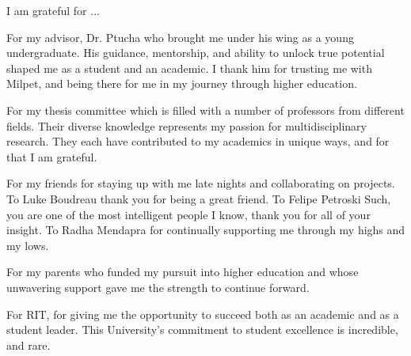 \documentclass[12pt,american]{report}
\begin{document}
%
\vfill
\begin{center}
\indent I am grateful for ...


For my advisor, Dr. Ptucha who brought me under his wing as a young undergraduate.  His guidance, mentorship, and ability to unlock true potential shaped me as a student and an academic.  I thank him for trusting me with Milpet, and being there for me in my journey through higher education.  


For my thesis committee which is filled with a number of professors from different fields.  Their diverse knowledge represents my passion for multidisciplinary research.  They each have contributed to my academics in unique ways, and for that I am grateful.


For my friends for staying up with me late nights and collaborating on projects.  To Luke Boudreau thank you for being a great friend.  To Felipe Petroski Such, you are one of the most intelligent people I know, thank you for all of your insight. To Radha Mendapra for continually supporting me through my highs and my lows.


For my parents who funded my pursuit into higher education and whose unwavering support gave me the strength to continue forward.


For RIT, for giving me the opportunity to succeed both as an academic and as a student leader.  This University's commitment to student excellence is incredible, and rare.


\end{center}
\vfill

\newcommand{\etc} {\emph{etc.\/}}
\newcommand{\etal}{\emph{et~al.\/}}
\newcommand{\eg}  {\emph{e.g.\/}}
\newcommand{\ie}  {\emph{i.e.\/}}
\end{document}
